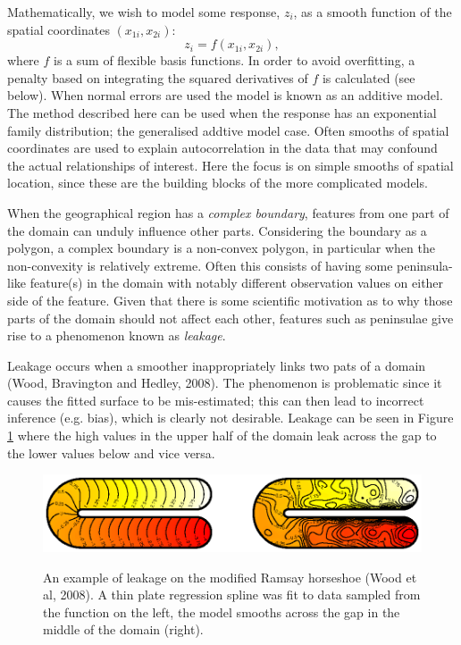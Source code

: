 \documentclass[useAMS,referee, usegraphicx]{biom}
\begin{document}
Mathematically, we wish to model some response, $z_i$, as a smooth function of the spatial coordinates $(x_{1i}, x_{2i})$:
\begin{equation*}
z_i = f(x_{1i}, x_{2i}),
\end{equation*}
where $f$ is a sum of flexible basis functions. In order to avoid overfitting, a penalty based on integrating the squared derivatives of $f$ is calculated (see below). When normal errors are used the model is known as an additive model. The method described here can be used when the response has an exponential family distribution; the generalised addtive model case. Often smooths of spatial coordinates are used to explain autocorrelation in the data that may confound the actual relationships of interest. Here the focus is on simple smooths of spatial location, since these are the building blocks of the more complicated models.

When the geographical region has a \emph{complex boundary}, features from one part of the domain can unduly influence other parts. Considering the boundary as a polygon, a complex boundary is a non-convex polygon, in particular when the non-convexity is relatively extreme. Often this consists of having some peninsula-like feature(s) in the domain with notably different observation values on either side of the feature. Given that there is some scientific motivation as to why those parts of the domain should not affect each other, features such as peninsulae give rise to a phenomenon known as \emph{leakage}.

Leakage occurs when a smoother inappropriately links two pats of a domain (Wood, Bravington and Hedley, 2008). The phenomenon is problematic since it causes the fitted surface to be mis-estimated; this can then lead to incorrect inference (e.g. bias), which is clearly not desirable. Leakage can be seen in Figure \ref{leakage} where the high values in the upper half of the domain leak across the gap to the lower values below and vice versa.

\begin{figure}
\centering
\includegraphics{figs/ramsay-leak.ps}\\
\caption{An example of leakage on the modified Ramsay horseshoe (Wood et al, 2008). A thin plate regression spline was fit to data sampled from the function on the left, the model smooths across the gap in the middle of the domain (right).}
\label{leakage}
\end{figure}
\end{document}
